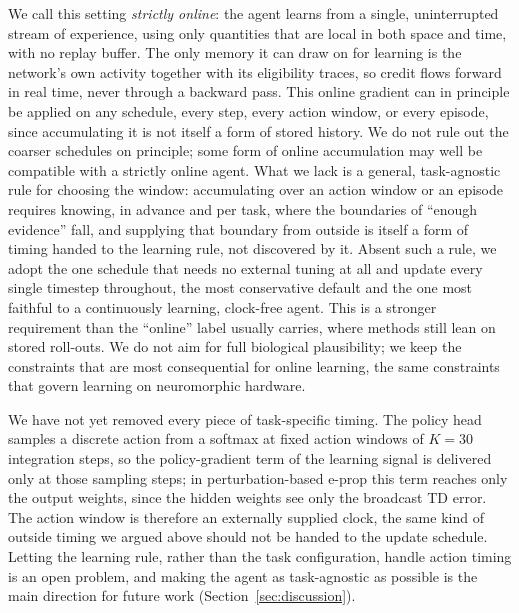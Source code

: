 \documentclass[10pt,twocolumn]{article}
\newcommand{\method}{perturbation-based e-prop}   %
\begin{document}
We call this setting \emph{strictly online}: the agent learns from a single,
uninterrupted stream of experience, using only quantities that are local in
both space and time, with no replay buffer. The only memory it can draw on for
learning is the network's own activity together with its eligibility traces,
so credit flows forward in real time, never through a backward pass. This
online gradient can in principle be applied on any schedule, every step, every
action window, or every episode, since accumulating it is not itself a form of
stored history. We do not rule out the coarser schedules on principle; some
form of online accumulation may well be compatible with a strictly online
agent. What we lack is a general, task-agnostic rule for choosing the window:
accumulating over an action window or an episode requires knowing, in advance
and per task, where the boundaries of ``enough evidence'' fall, and supplying
that boundary from outside is itself a form of timing handed to the learning
rule, not discovered by it. Absent such a rule, we adopt the one
schedule that needs no external tuning at all and update every single
timestep throughout, the most conservative default and the one most faithful
to a continuously learning, clock-free agent. This is a stronger requirement
than the ``online'' label usually carries, where methods still lean on stored
roll-outs. We do not aim for full biological plausibility; we keep the
constraints that are most consequential for online learning, the same
constraints that govern learning on neuromorphic hardware.

We have not yet removed every piece of task-specific timing. The policy head
samples a discrete action from a softmax at fixed action windows of $K=30$
integration steps, so the policy-gradient term of the learning signal is
delivered only at those sampling steps; in \method{} this term
reaches only the output weights, since the hidden weights see only the
broadcast TD error. The action window is therefore an externally supplied
clock, the same kind of outside timing we argued above should not be handed
to the update schedule. Letting the learning rule, rather than the task
configuration, handle action timing is an open problem, and making the agent
as task-agnostic as possible is the main direction for future work
(Section~\ref{sec:discussion}).
\end{document}
